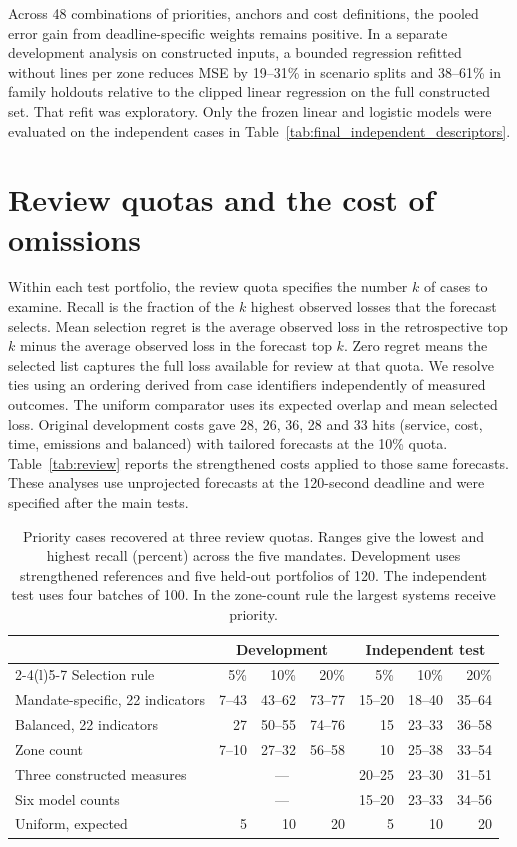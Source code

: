\documentclass[11pt,a4paper]{article}
\begin{document}
Across 48 combinations of priorities, anchors and cost definitions, the pooled error gain from deadline-specific weights remains positive. In a separate development analysis on constructed inputs, a bounded regression refitted without lines per zone reduces MSE by 19--31\% in scenario splits and 38--61\% in family holdouts relative to the clipped linear regression on the full constructed set. That refit was exploratory. Only the frozen linear and logistic models were evaluated on the independent cases in Table~\ref{tab:final_independent_descriptors}.


\section{Review quotas and the cost of omissions}
\label{app:selection}
Within each test portfolio, the review quota specifies the number $k$ of cases to examine. Recall is the fraction of the $k$ highest observed losses that the forecast selects. Mean selection regret is the average observed loss in the retrospective top $k$ minus the average observed loss in the forecast top $k$. Zero regret means the selected list captures the full loss available for review at that quota. We resolve ties using an ordering derived from case identifiers independently of measured outcomes. The uniform comparator uses its expected overlap and mean selected loss. Original development costs gave 28, 26, 36, 28 and 33 hits (service, cost, time, emissions and balanced) with tailored forecasts at the 10\% quota. Table~\ref{tab:review} reports the strengthened costs applied to those same forecasts. These analyses use unprojected forecasts at the 120-second deadline and were specified after the main tests.

\begin{table}[htbp]\centering\small
\caption{Priority cases recovered at three review quotas. Ranges give the lowest and highest recall (percent) across the five mandates. Development uses strengthened references and five held-out portfolios of 120. The independent test uses four batches of 100. In the zone-count rule the largest systems receive priority.}
\begin{tabular}{@{}lrrr rrr@{}}\toprule
& \multicolumn{3}{c}{Development} & \multicolumn{3}{c}{Independent test}\\
\cmidrule(lr){2-4}\cmidrule(l){5-7}
Selection rule & 5\% & 10\% & 20\% & 5\% & 10\% & 20\%\\\midrule
Mandate-specific, 22 indicators & 7--43 & 43--62 & 73--77 & 15--20 & 18--40 & 35--64\\
Balanced, 22 indicators & 27 & 50--55 & 74--76 & 15 & 23--33 & 36--58\\
Zone count & 7--10 & 27--32 & 56--58 & 10 & 25--38 & 33--54\\
Three constructed measures & \multicolumn{3}{c}{---} & 20--25 & 23--30 & 31--51\\
Six model counts & \multicolumn{3}{c}{---} & 15--20 & 23--33 & 34--56\\
Uniform, expected & 5 & 10 & 20 & 5 & 10 & 20\\
\bottomrule\end{tabular}
\end{table}
\end{document}
